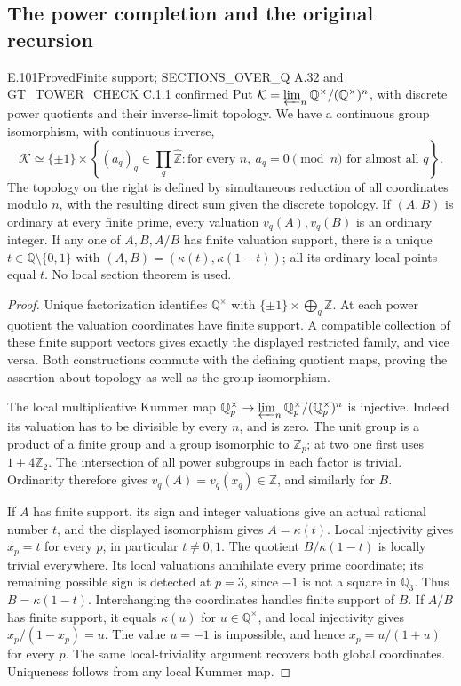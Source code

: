 \subsection{The power completion and the original recursion}

\begin{result}{E.101}{Proved}{Finite support; SECTIONS\_OVER\_Q A.32 and GT\_TOWER\_CHECK C.1.1 confirmed}
Put $\mathcal K=\varprojlim_n\mathbb Q^\times/(\mathbb Q^\times)^n$,
with discrete power quotients and their inverse-limit topology. We have a
continuous group isomorphism, with continuous inverse,
\[
\mathcal K\simeq\{\pm1\}\times
\left\{(a_q)_q\in\prod_q\widehat{\mathbb Z}:
  \text{for every }n,\ a_q=0\pmod n\text{ for almost all }q\right\}.
\]
The topology on the right is defined by simultaneous reduction of all
coordinates modulo $n$, with the resulting direct sum given the discrete
topology. If $(A,B)$ is ordinary at every finite prime, every valuation
$v_q(A),v_q(B)$ is an ordinary integer. If any one of $A,B,A/B$ has finite
valuation support, there is a unique $t\in\mathbb Q\setminus\{0,1\}$ with
$(A,B)=(\kappa(t),\kappa(1-t))$; all its ordinary local points equal $t$.
No local section theorem is used.
\end{result}
\begin{proof}
Unique factorization identifies $\mathbb Q^\times$ with
$\{\pm1\}\times\bigoplus_q\mathbb Z$. At each power quotient the valuation
coordinates have finite support. A compatible collection of these finite
support vectors gives exactly the displayed restricted family, and vice
versa. Both constructions commute with the defining quotient maps, proving
the assertion about topology as well as the group isomorphism.

The local multiplicative Kummer map
$\mathbb Q_p^\times\to\varprojlim_n\mathbb Q_p^\times/(\mathbb Q_p^\times)^n$
is injective. Indeed its valuation has to be divisible by every $n$, and
is zero. The unit group is a product of a finite group and a group
isomorphic to $\mathbb Z_p$; at two one first uses $1+4\mathbb Z_2$.
The intersection of all power subgroups in each factor is trivial.
Ordinarity therefore gives $v_q(A)=v_q(x_q)\in\mathbb Z$, and similarly
for $B$.

If $A$ has finite support, its sign and integer valuations give an actual
rational number $t$, and the displayed isomorphism gives $A=\kappa(t)$.
Local injectivity gives $x_p=t$ for every $p$, in particular $t\ne0,1$.
The quotient $B/\kappa(1-t)$ is locally trivial everywhere. Its local
valuations annihilate every prime coordinate; its remaining possible sign
is detected at $p=3$, since $-1$ is not a square in $\mathbb Q_3$.
Thus $B=\kappa(1-t)$. Interchanging the coordinates handles finite support
of $B$. If $A/B$ has finite support, it equals $\kappa(u)$ for
$u\in\mathbb Q^\times$, and local injectivity gives
$x_p/(1-x_p)=u$. The value $u=-1$ is impossible, and hence
$x_p=u/(1+u)$ for every $p$. The same local-triviality argument recovers
both global coordinates. Uniqueness follows from any local Kummer map.
\end{proof}


